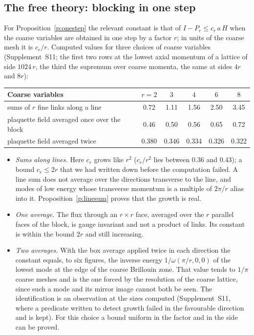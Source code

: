 \subsection*{The free theory: blocking in one step}
For Proposition~\ref{p:onestep} the relevant constant is that of $I-P_r\le c_r\,a\,H$ when the coarse
variables are obtained in one step by a factor $r$; in units of the coarse mesh it is $c_r/r$.
Computed values for three choices of coarse variables (Supplement~S11; the first two rows at the lowest
axial momentum of a lattice of side $1024\,r$, the third the supremum over coarse momenta, the same at
sides $4r$ and $8r$):
\begin{center}\small
\begin{tabular}{@{}lccccc@{}}
\toprule
Coarse variables & $r=2$ & $3$ & $4$ & $6$ & $8$ \\
\midrule
sums of $r$ fine links along a line & 0.72 & 1.11 & 1.56 & 2.50 & 3.45 \\
plaquette field averaged once over the block & 0.46 & 0.50 & 0.56 & 0.65 & 0.72 \\
plaquette field averaged twice & 0.380 & 0.346 & 0.334 & 0.326 & 0.322 \\
\bottomrule
\end{tabular}
\end{center}
\begin{itemize}
\item \emph{Sums along lines.} Here $c_r$ grows like $r^2$ ($c_r/r^2$ lies between $0.36$ and $0.43$); a
bound $c_r\le2r$ that we had written down before the computation failed. A line sum does not average over
the directions transverse to the line, and modes of low energy whose transverse momentum is a multiple of
$2\pi/r$ alias into it. Proposition~\ref{p:linesum} proves that the growth is real.
\item \emph{One average.} The flux through an $r\times r$ face, averaged over the $r$ parallel faces of the
block, is gauge invariant and not a product of links. Its constant is within the bound $2r$ and still
increasing.
\item \emph{Two averages.} With the box average applied twice in each direction the constant equals, to six
figures, the inverse energy $1/\omega(\pi/r,0,0)$ of the lowest mode at the edge of the coarse Brillouin
zone. That value tends to $1/\pi$ coarse meshes and is the one forced by the resolution of the coarse
lattice, since such a mode and its mirror image cannot both be seen. The identification is an observation
at the sizes computed (Supplement~S11, where a predicate written to detect growth failed in the favourable
direction and is kept). For this choice a bound uniform in the factor and in the side can be proved.
\end{itemize}


